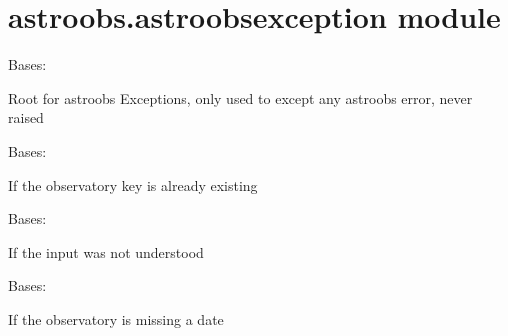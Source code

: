 \documentclass[letterpaper,10pt,english]{sphinxmanual}
\begin{document}
\section{astroobs.astroobsexception module}
\label{astroobs:astroobs-astroobsexception-module}\label{astroobs:module-astroobs.astroobsexception}

\begin{fulllineitems}
\label{astroobs:astroobs.astroobsexception.AstroobsException}
Bases: 

Root for astroobs Exceptions, only used to except any astroobs error, never raised

\end{fulllineitems}


\begin{fulllineitems}
\label{astroobs:astroobs.astroobsexception.DuplicateObservatory}
Bases: 

If the observatory key is already existing

\end{fulllineitems}


\begin{fulllineitems}
\label{astroobs:astroobs.astroobsexception.InputNotUnderstood}
Bases: 

If the input was not understood

\end{fulllineitems}


\begin{fulllineitems}
\label{astroobs:astroobs.astroobsexception.NoObservatoryDate}
Bases: 

If the observatory is missing a date

\end{fulllineitems}
\end{document}
